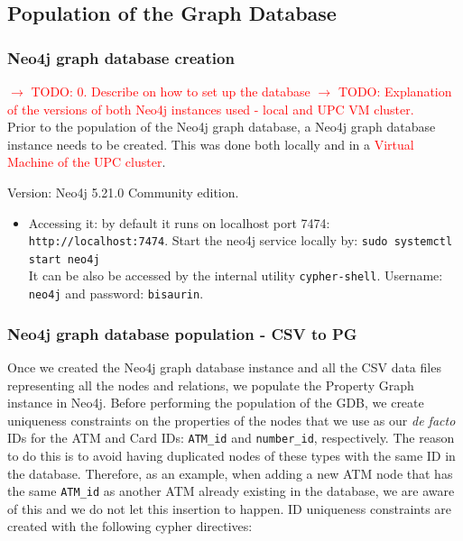 \subsection{Population of the Graph Database}


\subsubsection{Neo4j graph database creation}
\textcolor{red}{$\rightarrow$ TODO: 0. Describe on how to set up the database}
\textcolor{red}{$\rightarrow$ TODO: Explanation of the versions of both Neo4j instances used - local and UPC VM cluster.}\\

Prior to the population of the Neo4j graph database, a Neo4j graph database instance needs to be
created. This was done both locally and in a \textcolor{red}{Virtual Machine of the UPC cluster}.

Version: Neo4j 5.21.0 Community edition. 
\begin{itemize}
    \item Accessing it: by default it runs on localhost port 7474: \texttt{http://localhost:7474}.
    Start the neo4j service locally by: \texttt{sudo systemctl start neo4j}\\
    It can be also be accessed by the internal utility \texttt{cypher-shell}. Username: \texttt{neo4j} and password: \texttt{bisaurin}.
\end{itemize}

\subsubsection{Neo4j graph database population - CSV to PG}

Once we created the Neo4j graph database instance and all the CSV data files representing all the nodes and relations, we populate the Property Graph instance in Neo4j. Before performing the population of the GDB, we create uniqueness constraints on the properties of the nodes that we use as our \emph{de facto} IDs for the ATM and Card IDs: \texttt{ATM\_id} and \texttt{number\_id}, respectively. The reason to do this is to avoid having duplicated nodes of these types with the same ID in the database. Therefore, as an example, when adding a new ATM node that has the same \texttt{ATM\_id} as another ATM already existing in the database, we are aware of this and we do not let this insertion to happen. ID uniqueness constraints are created with the following cypher directives:

